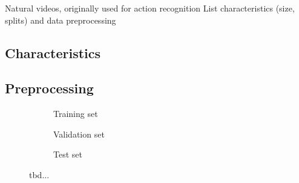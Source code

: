 


Natural videos, originally used for action recognition
List characteristics (size, splits) and data preprocessing
\subsection*{Characteristics}
\subsection*{Preprocessing}

\begin{figure}[htpb]
\centering
\begin{subfigure}{1.0\textwidth}
  \centering
  \caption{Training set}
  \label{fig:ucf_train_full}
  \vspace{.1cm}
\end{subfigure}
\begin{subfigure}{1.0\textwidth}
  \centering
  \caption{Validation set}
  \label{fig:ucf_valid_full}
  \vspace{.1cm}
\end{subfigure}
\begin{subfigure}{1.0\textwidth}
  \centering
  \caption{Test set}
  \label{fig:ucf_test_full}
\end{subfigure}
\caption[UCF-101 Image Sequence Samples]{tbd...}
\label{fig:ucf_full}
\end{figure}


